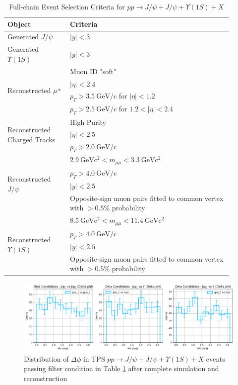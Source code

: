 \documentclass[10pt,twocolumn]{article}
\newcommand*{\GeVc}{~\text{GeV/c}}
\newcommand*{\GeVcs}{~\text{GeV}\text{c}^2}
\begin{document}
\begin{table}[h!]
    \centering
    \caption{Full-chain Event Selection Criteria for $pp\to J/\psi+J/\psi+\Upsilon(1S)+X$\\}
    \begin{tabular}{p{0.25\linewidth} p{0.65\linewidth}}
    \toprule
        \textbf{Object} & \textbf{Criteria} \\
        \midrule
        Generated $J/\psi $         & $\left|y\right|<3$ \\
        \midrule
        Generated $\Upsilon(1S)$    & $\left|y\right|<3$ \\
        \midrule
        \multirow[t]{4}{=}{Reconstructed $\mu^\pm $} & Muon ID "soft" \\
                & $|\eta| < 2.4$ \\
                & $p_T > 3.5\GeVc$ for $|\eta| < 1.2$ \\
                & $p_T > 2.5\GeVc$ for $1.2 < |\eta| < 2.4$ \\
        \multirow[t]{3}{=}{Reconstructed Charged Tracks} & High Purity \\
                  & $|\eta|<2.5$ \\
                  & $p_T > 2.0 \GeVc$ \\
        \midrule
        \multirow[t]{4}{=}{Reconstructed $J/\psi$} & $2.9 \GeVcs < m_{\mu\mu} < 3.3 \GeVcs$ \\
                & $p_T > 4.0\GeVc$ \\
                & $|y| < 2.5$ \\
                & Opposite-sign muon pairs fitted to common vertex with $> 0.5\%$ probability \\
        \midrule
        \multirow[t]{4}{=}{Reconstructed $\Upsilon(1S)$} & $8.5\GeVcs < m_{\mu\mu} < 11.4 \GeVcs$ \\
                & $p_T > 4.0\GeVc$ \\
                & $|y| < 2.5$ \\
                & Opposite-sign muon pairs fitted to common vertex with $> 0.5\%$ probability \\
        \bottomrule
    \end{tabular}
    \label{tab:JpsiJpsiY_MC_Full_Filter}
\end{table}

\begin{figure}[!htbp]
    \centering
    \includegraphics[width=1.0\linewidth]{images/Ntuple_LEVEL_TPS_DeltaPhi_filtered.png}
    \caption{Distribution of $\Delta \phi$ in TPS $pp\to J/\psi+J/\psi+\Upsilon(1S)+X$ events passing filter condition in Table \ref{tab:JpsiJpsiY_MC_Full_Filter} after complete simulation and reconstruction}
    \label{fig:TPS_JJY1S_filtered_DeltaPhi_Ntuple}
\end{figure}
\end{document}
